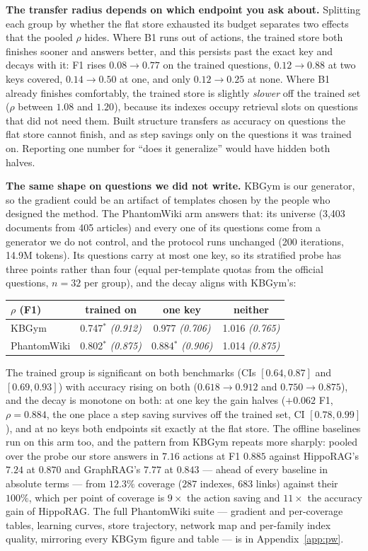 \documentclass[conference]{IEEEtran}
\newcommand{\kbgym}{KBGym}
\begin{document}
\textbf{The transfer radius depends on which endpoint you ask about.}
Splitting each group by whether the flat store exhausted its budget
separates two effects that the pooled $\rho$ hides. Where B1 runs out of
actions, the trained store both finishes sooner and answers better, and this
persists past the exact key and decays with it: F1 rises $0.08 \to 0.77$
on the trained questions, $0.12 \to 0.88$ at two keys covered,
$0.14 \to 0.50$ at one, and only $0.12 \to 0.25$ at none. Where B1
already finishes comfortably, the trained store is slightly \emph{slower}
off the trained set ($\rho$ between $1.08$ and $1.20$), because its
indexes occupy retrieval slots on questions that did not need them. Built
structure transfers as accuracy on questions the flat store cannot finish,
and as step savings only on the questions it was trained on. Reporting one
number for ``does it generalize'' would have hidden both halves.

\textbf{The same shape on questions we did not write.} \kbgym{} is our
generator, so the gradient could be an artifact of templates chosen by the
people who designed the method. The PhantomWiki arm answers that: its
universe (3{,}403 documents from 405 articles) and every one of its
questions come from a generator we do not control, and the protocol runs
unchanged (200 iterations, 14.9M tokens). Its questions carry at most one
key, so its stratified probe has three points rather than four (equal
per-template quotas from the official questions, $n{=}32$ per group), and
the decay aligns with \kbgym{}'s:

\begin{center}\small
\begin{tabular}{lccc}
\toprule
$\rho$ (F1) & trained on & one key & neither \\
\midrule
\kbgym{} & 0.747$^{*}$ \emph{(0.912)} & 0.977 \emph{(0.706)} & 1.016 \emph{(0.765)} \\
PhantomWiki & 0.802$^{*}$ \emph{(0.875)} & 0.884$^{*}$ \emph{(0.906)} & 1.014 \emph{(0.875)} \\
\bottomrule
\end{tabular}
\end{center}

The trained group is significant on both benchmarks (CIs $[0.64,0.87]$ and
$[0.69,0.93]$) with accuracy rising on both ($0.618 \to 0.912$ and
$0.750 \to 0.875$), and the decay is monotone on both: at one key the
gain halves ($+0.062$ F1, $\rho = 0.884$, the one place a step saving
survives off the trained set, CI $[0.78,0.99]$), and at no keys both
endpoints sit exactly at the flat store. The offline baselines run on this
arm too, and the pattern from \kbgym{} repeats more sharply: pooled over
the probe our store answers in $7.16$ actions at F1 $0.885$ against
HippoRAG's $7.24$ at $0.870$ and GraphRAG's $7.77$ at $0.843$ --- ahead of
every baseline in absolute terms --- from $12.3\%$ coverage ($287$
indexes, $683$ links) against their $100\%$, which per point of coverage
is $9\times$ the action saving and $11\times$ the accuracy gain of
HippoRAG. The full PhantomWiki suite --- gradient and per-coverage tables,
learning curves, store trajectory, network map and per-family index quality,
mirroring every \kbgym{} figure and table --- is in
Appendix~\ref{app:pw}.
\end{document}
